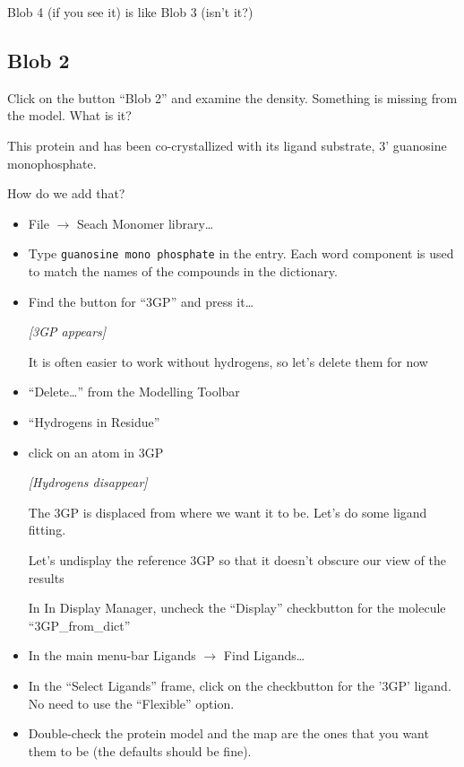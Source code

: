 \documentclass{article}
\begin{document}
Blob 4 (if you see it) is like Blob 3 (isn't it?)

\subsection{Blob 2}
Click on the button \textsf{``Blob 2''} and examine the density.
Something is missing from the model.  What is it?


This protein and has been co-crystallized with its ligand substrate, 3' guanosine monophosphate.

How do we add that?

\begin{itemize}
\item \textsf{File $\rightarrow$ Seach Monomer library\ldots}
\item Type \texttt{guanosine mono phosphate} in the entry.
  Each word component is used to match the names of the compounds in the dictionary.

\item Find the button for ``3GP'' and press it\ldots

\textsl{ [3GP appears]}

It is often easier to work without hydrogens, so let's delete them for now

\item \textsf{``Delete\ldots''} from the Modelling Toolbar

\item \textsf{``Hydrogens in Residue''}
\item click on an atom in 3GP

\textsl{ [Hydrogens disappear]}

The 3GP is displaced from where we want it to be. Let's do some ligand fitting.

Let's undisplay the reference 3GP so that it doesn't obscure our view of the results

In \textsf{In Display Manager}, uncheck the ``Display'' checkbutton for the molecule ``3GP\_from\_dict''

\item In the main menu-bar \textsf{Ligands $\rightarrow$ Find Ligands\ldots}

\item In the ``Select Ligands'' frame, click on the checkbutton for the '3GP' ligand.
    No need to use the ``Flexible'' option.

\item Double-check the protein model and the map are the ones that you want them to be (the
  defaults should be fine).


\end{itemize}
\end{document}
